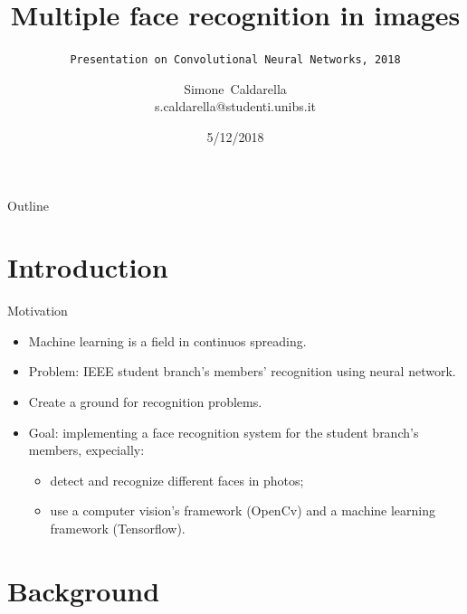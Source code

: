 \documentclass{beamer}
\title[Face recognition]{\textbf{Multiple face recognition in images}}
\subtitle{\texttt{Presentation on Convolutional Neural Networks, 2018}}
\author[Simone Caldarella]
{Simone~Caldarella\\
s.caldarella@studenti.unibs.it}
\institute[University of Brescia] 
{
  	IEEE Student Branch Brescia\\
  	University of Brescia
}
\date[IEEE Student Branch 2018] 
{
	5/12/2018
}
\begin{document}
\begin{frame}
 	\titlepage
\end{frame}

\begin{frame}{Outline}
	\begin{multicols}{2}
  		\tableofcontents
	\end{multicols}
\end{frame}


\section{Introduction}


\begin{frame}{Motivation}
	\begin{itemize}
		\setlength\itemsep{1em}
		[triangle]
		\item
			Machine learning is a field in continuos spreading.
		\item
			Problem: IEEE student branch's members' recognition using neural network.
		\item 
    			Create a ground for recognition problems.
		\item
			Goal: implementing a face recognition system for the student branch's members, expecially:
		\begin{itemize}
				[circle]
    				\item
      					detect and recognize different faces in photos;
    				\item    
      					use a computer vision's framework (OpenCv) and a machine learning framework (Tensorflow).
 
			\end{itemize}
	\end{itemize}
\end{frame}



\section{Background}
\end{document}
